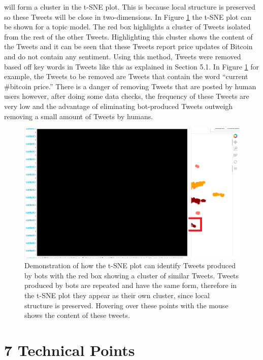 \documentclass[
]{article}
\begin{document}
will form a cluster in the t-SNE plot. This is because local structure
is preserved so these Tweets will be close in two-dimensions. In Figure
\ref{fig:tsnebot} the t-SNE plot can be shown for a topic model. The red
box highlights a cluster of Tweets isolated from the rest of the other
Tweets. Highlighting this cluster shows the content of the Tweets and it
can be seen that these Tweets report price updates of Bitcoin and do not
contain any sentiment. Using this method, Tweets were removed based off
key words in Tweets like this as explained in Section 5.1. In Figure
\ref{fig:tsnebot} for example, the Tweets to be removed are Tweets that
contain the word ``current \#bitcoin price.'' There is a danger of
removing Tweets that are posted by human users however, after doing some
data checks, the frequency of these Tweets are very low and the
advantage of eliminating bot-produced Tweets outweigh removing a small
amount of Tweets by humans.

\begin{figure}

{\centering \includegraphics[width=1\linewidth]{images/tsnebots} 

}

\caption{Demonstration of how the t-SNE plot can identify Tweets produced by bots with the red box showing a cluster of similar Tweets. Tweets produced by bots are repeated and have the same form, therefore in the t-SNE plot they appear as their own cluster, since local structure is preserved. Hovering over these points with the mouse shows the content of these tweets.}\label{fig:tsnebot}
\end{figure}
\newpage

\hypertarget{technical-points}{%
\section{7 Technical Points}\label{technical-points}}
\end{document}
